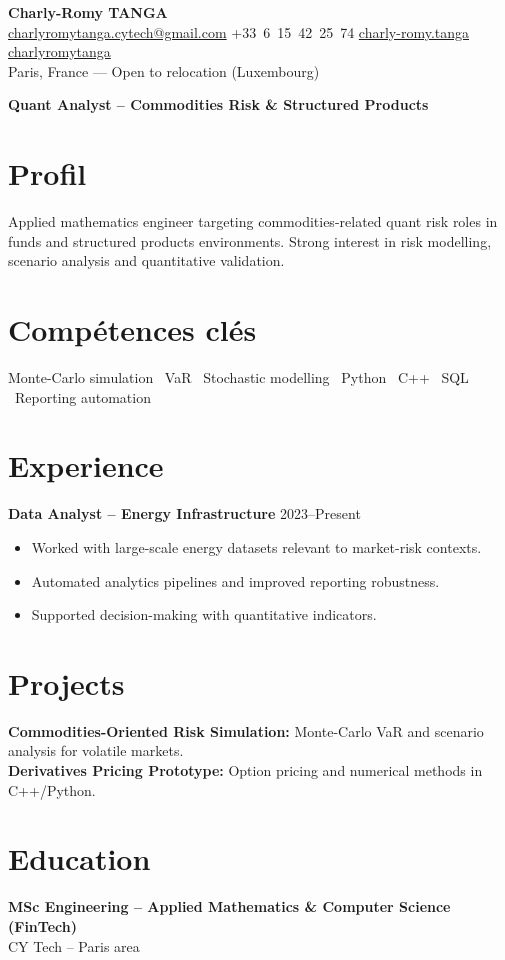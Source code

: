 \documentclass[10pt, letterpaper]{article}
\begin{document}
\begin{center}
\textbf{\LARGE Charly-Romy TANGA}\\[0.15cm]
\mbox{\href{mailto:charlyromytanga.cytech@gmail.com}{\footnotesize\faEnvelope\hspace*{0.1cm}charlyromytanga.cytech@gmail.com}}\kern0.25cm
\mbox{\faPhone\hspace*{0.1cm}+33 6 15 42 25 74}\kern0.25cm
\mbox{\href{https://www.linkedin.com/in/charly-romy-tanga}{\footnotesize\faLinkedin\hspace*{0.1cm}charly-romy.tanga}}\kern0.25cm
\mbox{\href{https://github.com/charlyromytanga}{\footnotesize\faGithub\hspace*{0.1cm}charlyromytanga}}\\[0.15cm]
Paris, France --- Open to relocation (Luxembourg)
\end{center}
\textbf{Quant Analyst -- Commodities Risk \& Structured Products}
\section*{Profil}
Applied mathematics engineer targeting commodities-related quant risk roles in funds and structured products environments. Strong interest in risk modelling, scenario analysis and quantitative validation.
\section*{Compétences clés}
Monte-Carlo simulation \textbullet\ VaR \textbullet\ Stochastic modelling \textbullet\ Python \textbullet\ C++ \textbullet\ SQL \textbullet\ Reporting automation
\section*{Experience}
\textbf{Data Analyst -- Energy Infrastructure} \hfill 2023--Present
\begin{itemize}[leftmargin=0.45cm,itemsep=1pt,topsep=2pt]
\item Worked with large-scale energy datasets relevant to market-risk contexts.
\item Automated analytics pipelines and improved reporting robustness.
\item Supported decision-making with quantitative indicators.
\end{itemize}
\section*{Projects}
\textbf{Commodities-Oriented Risk Simulation:} Monte-Carlo VaR and scenario analysis for volatile markets.\\
\textbf{Derivatives Pricing Prototype:} Option pricing and numerical methods in C++/Python.
\section*{Education}
\textbf{MSc Engineering -- Applied Mathematics \& Computer Science (FinTech)}\\CY Tech -- Paris area
\end{document}
